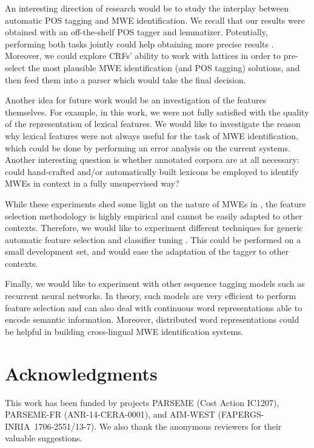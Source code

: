 \documentclass[output=paper,
modfonts
]{langscibook}
\begin{document}
An interesting direction of research  would be to study the interplay between automatic POS tagging and MWE identification. We recall that our results were obtained with an off-the-shelf POS tagger and lemmatizer. Potentially, performing both tasks jointly could help obtaining more precise results \citep{constant-sigogne:2011:MWE}. Moreover, we could explore CRFs' ability to work with lattices in order to pre-select the most plausible MWE identification (and POS tagging) solutions, and then feed them into a parser which would take the final decision.

Another idea for future work would be an investigation of the features themselves. For example, in this work, we were not fully satisfied with the quality of the representation of lexical features. We would like to investigate the reason why lexical features were not always useful for the task of MWE identification, which could be done by performing an error analysis on the current systems. Another interesting question is whether annotated corpora are at all necessary: could hand-crafted and/or automatically built lexicons be employed to identify MWEs in context in a fully unsupervised way?

While these experiments shed some light on the nature of MWEs in , the feature selection methodology is highly empirical and cannot be easily adapted to other contexts. Therefore, we would like to experiment different techniques for generic automatic feature selection and classifier tuning \citep{Ekbal2012}. This could be performed on a small development set, and would ease the adaptation of the tagger to other contexts.

Finally, we would like to experiment with other sequence tagging models such as recurrent neural networks. In theory, such models are very efficient to perform feature selection and can also deal with continuous word representations able to encode semantic information. Moreover, distributed word representations could be helpful in building cross-lingual MWE identification systems.
  
\section*{Acknowledgments}

This work has been funded by projects PARSEME (Cost Action IC1207), PARSEME-FR (ANR-14-CERA-0001), and AIM-WEST (FAPERGS-INRIA~1706-2551/13-7). We also thank the anonymous reviewers for their valuable suggestions.
\end{document}
